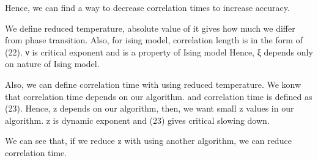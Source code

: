 \documentclass[10pt]{beamer}
\begin{document}
{Hence, we can find a way to decrease correlation times to increase 
accuracy.

We define reduced temperature, absolute value of it gives how much we differ from phase transition. Also, for ising model, correlation length is in the form of (22). ν is critical exponent and is a property of Ising model
Hence, ξ depends only on nature of Ising model.

Also, we can define correlation time with using reduced temperature.  We konw that correlation time depends on our algorithm. and correlation time is defined as (23). Hence, z depends on our algorithm, then, we want small z values in our algorithm. z is dynamic exponent and (23) gives critical slowing down.

We can see that, if we reduce z with using another algorithm, we can reduce correlation time. 

}
\end{document}
